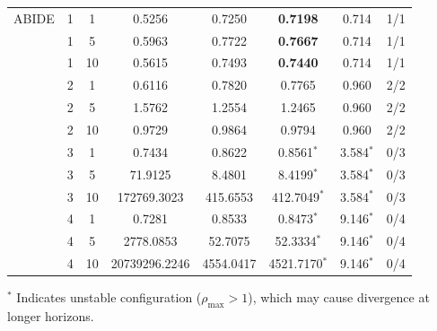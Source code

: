\begin{table}[h!]
\begin{tabular}{llcccccc}
\midrule
ABIDE & 1 & 1 & 0.5256 & 0.7250 & \textbf{0.7198} & 0.714 & 1/1 \\
 & 1 & 5 & 0.5963 & 0.7722 & \textbf{0.7667} & 0.714 & 1/1 \\
 & 1 & 10 & 0.5615 & 0.7493 & \textbf{0.7440} & 0.714 & 1/1 \\
 & 2 & 1 & 0.6116 & 0.7820 & 0.7765 & 0.960 & 2/2 \\
 & 2 & 5 & 1.5762 & 1.2554 & 1.2465 & 0.960 & 2/2 \\
 & 2 & 10 & 0.9729 & 0.9864 & 0.9794 & 0.960 & 2/2 \\
 & 3 & 1 & 0.7434 & 0.8622 & 0.8561$^*$ & 3.584$^*$ & 0/3 \\
 & 3 & 5 & 71.9125 & 8.4801 & 8.4199$^*$ & 3.584$^*$ & 0/3 \\
 & 3 & 10 & 172769.3023 & 415.6553 & 412.7049$^*$ & 3.584$^*$ & 0/3 \\
 & 4 & 1 & 0.7281 & 0.8533 & 0.8473$^*$ & 9.146$^*$ & 0/4 \\
 & 4 & 5 & 2778.0853 & 52.7075 & 52.3334$^*$ & 9.146$^*$ & 0/4 \\
 & 4 & 10 & 20739296.2246 & 4554.0417 & 4521.7170$^*$ & 9.146$^*$ & 0/4 \\
\bottomrule
\end{tabular}
\vspace{0.1cm}
\footnotesize{$^*$ Indicates unstable configuration ($\rho_{\max} > 1$), which may cause divergence at longer horizons.}
\end{table}